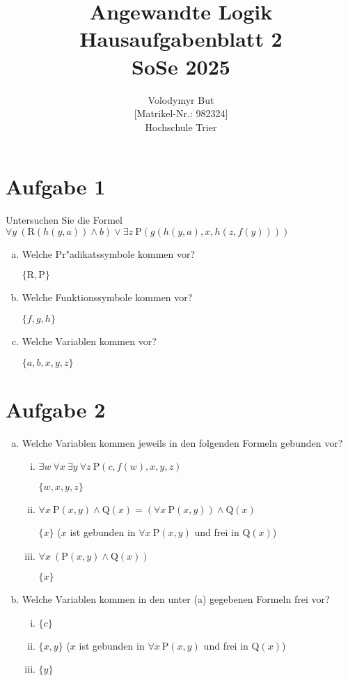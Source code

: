 \documentclass[10pt, oneside]{article}
\title{Angewandte Logik\\[15pt]\Large{Hausaufgabenblatt 2}\\[10pt]\Large{SoSe 2025}}
\author{Volodymyr But\\[5pt][Matrikel-Nr.: 982324]\\[10pt]Hochschule Trier}
\date{}
\begin{document}
\maketitle
\vspace{25px}

\section{Aufgabe 1}

Untersuchen Sie die Formel $\forall y \: (\text{R}(h(y, a)) \land b) \lor \exists z \: \text{P}(g(h(y, a), x, h(z, f(y))))$

\begin{enumerate}[(a)]
    \item Welche Pr"adikatssymbole kommen vor?

        $\{\text{R}, \text{P}\}$

    \item Welche Funktionssymbole kommen vor?

        $\{f, g, h\}$

    \item Welche Variablen kommen vor?

        $\{a, b, x, y, z\}$

\end{enumerate}

\section{Aufgabe 2}

\begin{enumerate}[(a)]
    \item Welche Variablen kommen jeweils in den folgenden Formeln gebunden vor?
        \begin{enumerate}[i)]
            \item $\exists w \: \forall x \: \exists y \: \forall z \: \text{P}(c, f(w), x, y, z)$

                $\{w, x, y, z\}$

            \item $\forall x \: \text{P}(x, y) \land \text{Q}(x) = (\forall x \: \text{P}(x, y)) \land \text{Q}(x)$

                $\{x\}$ ($x$ ist gebunden in $\forall x \: \text{P}(x, y)$ und frei in $\text{Q}(x)$)

            \item $\forall x \: (\text{P}(x, y) \land \text{Q}(x))$

                $\{x\}$
        \end{enumerate}

    \item Welche Variablen kommen in den unter (a) gegebenen Formeln frei vor?
        \begin{enumerate}[i)]
            \item $\{c\}$
            \item $\{x, y\}$ ($x$ ist gebunden in $\forall x \: \text{P}(x, y)$ und frei in $\text{Q}(x)$)
            \item $\{y\}$
        \end{enumerate}
\end{enumerate}
\end{document}
